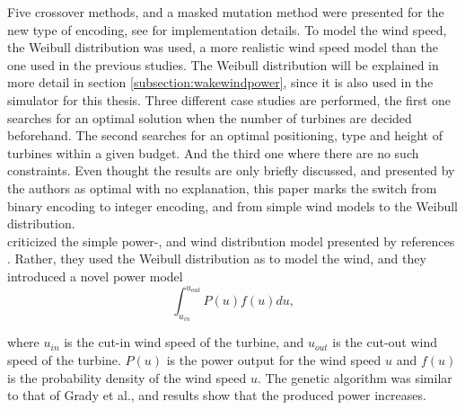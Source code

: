 \noindent Five crossover methods, and a masked mutation method were presented for the new type of encoding, see \cite{Mora} for implementation details. To model the wind speed, the Weibull distribution was used, a more realistic wind speed model than the one used in the previous studies. The Weibull distribution will be explained in more detail in section \ref{subsection:wakewindpower}, since it is also used in the simulator for this thesis. Three different case studies are performed, the first one searches for an optimal solution when the number of turbines are decided beforehand. The second searches for an optimal positioning, type and height of turbines within a given budget. And the third one where there are no such constraints. Even thought the results are only briefly discussed, and presented by the authors as optimal with no explanation, this paper marks the switch from binary encoding to integer encoding, and from simple wind models to the Weibull distribution.\\


\noindent \cite{Wan} criticized the simple power-, and wind distribution model presented by references \citep{Mosetti, Grady}. Rather, they used the Weibull distribution as \citep{Mora} to model the wind, and they introduced a novel power model \\


\begin{equation}
\label{Power Model (Wan)}
\int_{u_{in}}^{u_{out}} P(u)f(u) du,
\end{equation}


\noindent where $u_{in}$ is the cut-in wind speed of the turbine, and $u_{out}$ is the cut-out wind speed of the turbine. $P(u)$ is the power output for the wind speed $u$ and $f(u)$ is the probability density of the wind speed $u$. The genetic algorithm was similar to that of Grady et al., and results show that the produced power increases.\\



